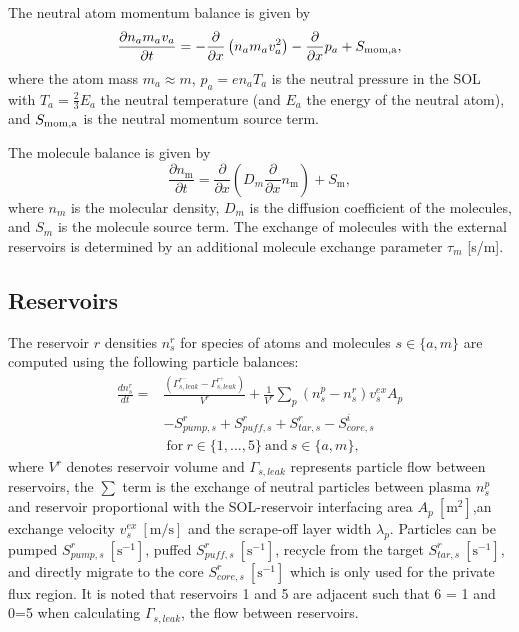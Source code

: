 \documentclass[amsmath,amssymb,a4]{revtex4-2}
\begin{document}
\noindent The neutral atom momentum balance is given by
\begin{equation}\label{eq: neutral momentum}
    {\partial n_a m_a v_a \over \partial t} = - {\partial \over \partial x} \left({n_a m_a v_a^2}\right) - {\partial \over \partial x} p_a + S_{\rm mom,a},%
\end{equation}
where the atom mass $m_a \approx m$, $p_a = en_aT_a$ is the neutral pressure in the SOL with $T_a = \frac{2}{3}E_a$ the neutral temperature (and $E_a$ the energy of the neutral atom), and $S_{\rm mom,a}$ is the neutral momentum source term.

\noindent The molecule balance is given by 
\begin{equation}
    \frac{\partial n_{\mathrm{m}}}{\partial t}=\frac{\partial}{\partial x}\left( D_m \frac{\partial}{\partial x} n_{\mathrm{m}}\right)+S_{\mathrm{m}}, %
    \label{eq:molecule balance}
\end{equation}
where $n_m$ is the molecular density, $D_m$ is the diffusion coefficient of the molecules, and $S_m$ is the molecule source term. The exchange of molecules with the external reservoirs is determined by an additional molecule exchange parameter $\tau_m$ [s/m].

\subsection{Reservoirs}
 The reservoir $r$ densities $n^r_s$ for species of atoms and molecules $s \in \{a,m\}$ are computed using the following particle balances: 
\begin{equation}
    \begin{aligned}
   \frac{dn^{r}_{s}}{dt}=& \frac{(\Gamma^{r^-}_{s,leak}-\Gamma^{r^+}_{s,leak})}{ V^r} + \frac{1}{ V^r}\sum_p (n_{s}^p-n^r_{s}){v^{ex}_s} A_p \\\
    &-S^r_{pump,s}+S^r_{puff,s} +S^r_{tar,s}-S_{core,s}^i \\
    & ~\text{for} ~r \in \{ 1, ...,5 \} ~\text{and}~ s \in \{a,m\},
    \end{aligned}
    \label{eq: reservoir balance}
\end{equation}
where $V^r$ denotes reservoir volume and $\Gamma_{s,leak}$ represents particle flow between reservoirs, the $\sum$ term is the exchange of neutral particles between plasma $n^p_s$ and reservoir proportional with the SOL-reservoir interfacing area $A_{p}~\mathrm{[m^2]}$,an exchange velocity $v^{ex}_s~\mathrm{[m/s]}$ and the scrape-off layer width $\lambda_p$. Particles can be pumped $S^r_{pump,s}~\mathrm{[s^{-1}]}$, puffed $S^r_{puff,s}~\mathrm{[s^{-1}]}$, recycle from the target $S^r_{tar,s}~\mathrm{[s^{-1}]}$, and directly migrate to the core $S^r_{core,s}~\mathrm{[s^{-1}]}$ which is only used for the private flux region. It is noted that reservoirs 1 and 5 are adjacent such that 6 = 1 and 0=5 when calculating  $\Gamma_{s,leak}$, the flow between reservoirs. 
\end{document}
